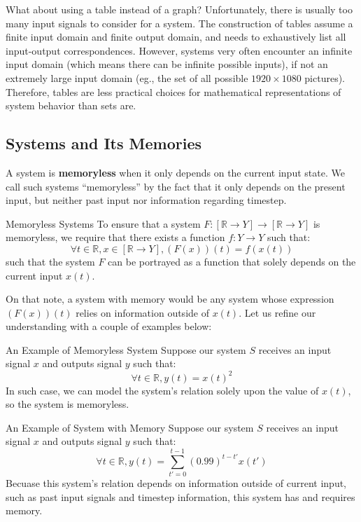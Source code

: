 What about using a table instead of a graph?
Unfortunately, there is usually too many input signals to consider for a system.
The construction of tables assume a finite input domain and finite output domain, and needs to exhaustively list all input-output correspondences.
However, systems very often encounter an infinite input domain (which means there can be infinite possible inputs), if not an extremely large input domain (eg., the set of all possible $1920\times1080$ pictures).
Therefore, tables are less practical choices for mathematical representations of system behavior than sets are.

\subsection{Systems and Its Memories}
A system is \textbf{memoryless} when it only depends on the current input state. We call such systems ``memoryless'' by the fact that it only depends on the present input, but neither past input nor information regarding timestep.
\begin{ln-define}{Memoryless Systems}{}
    To ensure that a system $F: [\mathbb{R} \rightarrow Y] \rightarrow [\mathbb{R} \rightarrow Y]$ is memoryless, we require that there exists a function $f: Y \rightarrow Y$ such that:
    \[
        \forall t \in \mathbb{R}, x \in [\mathbb{R} \rightarrow Y], (F(x))(t) = f(x(t))
    \]
    such that the system $F$ can be portrayed as a function that solely depends on the current input $x(t)$.
\end{ln-define}

On that note, a system with memory would be any system whose expression $(F(x))(t)$ relies on information outside of $x(t)$.
Let us refine our understanding with a couple of examples below:
\begin{ln-example}{An Example of Memoryless System}{}
    Suppose our system $S$ receives an input signal $x$ and outputs signal $y$ such that:
    \[
        \forall t \in \mathbb{R}, y(t) = {x(t)}^2
    \]
    In such case, we can model the system's relation solely upon the value of $x(t)$, so the system is memoryless.
\end{ln-example}

\begin{ln-example}{An Example of System with Memory}{}
    Suppose our system $S$ receives an input signal $x$ and outputs signal $y$ such that:
    \[
        \forall t \in \mathbb{R}, y(t) = \sum_{t'=0}^{t-1} {(0.99)}^{t - t'} x(t')
    \]
    Becuase this system's relation depends on information outside of current input, such as past input signals and timestep information, this system has and requires memory.
\end{ln-example}

